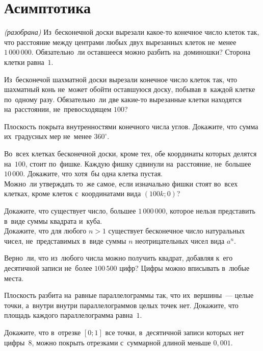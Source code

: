
\section*{Асимптотика}


\begin{problems}

\emph{(разобрана)}
Из~бесконечной доски вырезали какое-то конечное число клеток так, что
расстояние между центрами любых двух вырезанных клеток не~менее $1\,000\,000$.
Обязательно~ли оставшееся можно разбить на~доминошки?
Сторона клетки равна~$1$.

\item
Из~бесконечой шахматной доски вырезали конечное число клеток так, что шахматный
конь не~может обойти оставшуюся доску, побывав в~каждой клетке по~одному разу.
Обязательно~ли две какие-то вырезанные клетки находятся на~расстоянии,
не~превосходящем $100$?

\item
Плоскость покрыта внутренностями конечного числа углов.
Докажите, что сумма их~градусных мер не~менее $360^{\circ}$.

\item
\subproblem
Во~всех клетках бесконечной доски, кроме тех, обе координаты которых делятся
на~$100$, стоит по~фишке.
Каждую фишку сдвинули на~расстояние, не~большее $10\,000$.
Докажите, что хотя~бы одна клетка пустая.
\\
\subproblem
Можно~ли утверждать то~же самое, если изначально фишки стоят во~всех клетках,
кроме клеток с~координатами вида $(100 k; 0)$?

\item
\subproblem
Докажите, что существует число, большее $1\,000\,000$, которое нельзя
представить в~виде суммы квадрата и~куба.
\\
\subproblem
Докажите, что для любого $n > 1$ существует бесконечное число натуральных
чисел, не~представимых в~виде суммы $n$ неотрицательных чисел вида $a^n$.

\item
Верно~ли, что из~любого числа можно получить квадрат, добавляя к~его десятичной
записи не~более $100\,500$ цифр?
Цифры можно вписывать в~любые места.

\item
Плоскость разбита на~равные параллелограммы так, что их~вершины~--- целые
точки, а~внутри внутри параллелограммов целых точек нет.
Докажите, что площадь каждого параллелограмма равна~$1$.

\item
Докажите, что в~отрезке $[0; 1]$ все точки, в~десятичной записи которых нет
цифры~$8$, можно покрыть отрезками с~суммарной длиной меньше $0{,}001$.

\end{problems}

